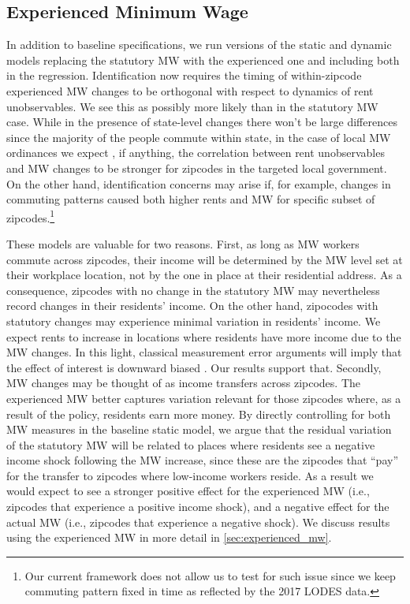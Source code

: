 \subsection{Experienced Minimum Wage}\label{sec:emp_strategy_expmw}

In addition to baseline specifications, we run versions of the static and dynamic models 
replacing the statutory MW with the experienced one and including both in 
the regression. Identification now requires the timing of within-zipcode 
experienced MW changes to be orthogonal with respect to dynamics of rent
unobservables. We see this as possibly more likely than in the statutory MW case. 
While in the presence of state-level changes there won't be large differences since the
majority of the people commute within state, in the case of local MW ordinances we expect 
, if anything, the correlation between rent unobservables and MW changes to be stronger for
zipcodes in the targeted local government. On the other hand, identification concerns may arise 
if, for example, changes in commuting patterns caused both higher rents and MW for specific 
subset of zipcodes.\footnote{Our current framework does not allow us to test for such issue
since we keep commuting pattern fixed in time as reflected by the 2017 LODES data.}

These models are valuable for two reasons. First, as long as MW workers commute across zipcodes, 
their income will be determined by the 
MW level set at their workplace location, not by the one in place at their residential address.
As a consequence, zipcodes with no change in 
the statutory MW may nevertheless record changes in their residents' income. On the other hand, 
zipocodes with statutory changes may experience minimal variation in residents' income. 
We expect rents to increase in locations where residents have more income due to the MW 
changes. In this light, classical measurement error arguments will imply that the effect of interest 
is downward biased \parencite{AngristPischke2009}. Our results support that.  Secondly, 
MW changes may be thought of as income transfers across zipcodes. 
The experienced MW better captures variation relevant for those zipcodes 
where, as a result of the policy, residents earn more money. 
By directly controlling for both MW measures in the baseline static model, 
we argue that the residual variation of the statutory MW will be related to places where 
residents see a negative income shock following the MW increase, since these are the 
zipcodes that ``pay'' for the transfer to zipcodes where low-income workers reside. 
As a result we would expect to see a stronger positive effect for the experienced MW 
(i.e., zipcodes that experience a positive income shock), and a negative effect for 
the actual MW (i.e., zipcodes that experience a negative shock). We discuss results using the experienced MW in more detail in \autoref{sec:experienced_mw}.



